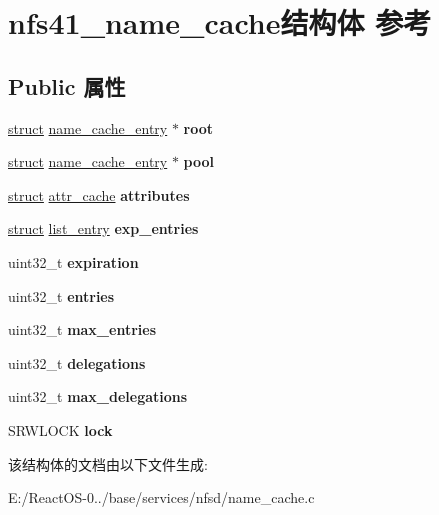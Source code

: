 \hypertarget{structnfs41__name__cache}{}\section{nfs41\+\_\+name\+\_\+cache结构体 参考}
\label{structnfs41__name__cache}
\subsection*{Public 属性}
\begin{DoxyCompactItemize}
\item 
\mbox{\label{structnfs41__name__cache_a488b35b5f3400b1c8a57eb3542071c91}} 
\hyperlink{interfacestruct}{struct} \hyperlink{structname__cache__entry}{name\+\_\+cache\+\_\+entry} $\ast$ {\bfseries root}
\item 
\mbox{\label{structnfs41__name__cache_a662be50ac4bb11db1a0e59beb7878007}} 
\hyperlink{interfacestruct}{struct} \hyperlink{structname__cache__entry}{name\+\_\+cache\+\_\+entry} $\ast$ {\bfseries pool}
\item 
\mbox{\label{structnfs41__name__cache_a0206087a30fb29598b186c6ed388f1f7}} 
\hyperlink{interfacestruct}{struct} \hyperlink{structattr__cache}{attr\+\_\+cache} {\bfseries attributes}
\item 
\mbox{\label{structnfs41__name__cache_a465667ff2b98b0042c92470016f69082}} 
\hyperlink{interfacestruct}{struct} \hyperlink{structlist__entry}{list\+\_\+entry} {\bfseries exp\+\_\+entries}
\item 
\mbox{\label{structnfs41__name__cache_a00b91dc94f7cc046602073ea33e02b7e}} 
uint32\+\_\+t {\bfseries expiration}
\item 
\mbox{\label{structnfs41__name__cache_ac04d28100f8d3a77b91ef792aec7998b}} 
uint32\+\_\+t {\bfseries entries}
\item 
\mbox{\label{structnfs41__name__cache_ad3fbc66a758fedbe0d779ea653c8ac3b}} 
uint32\+\_\+t {\bfseries max\+\_\+entries}
\item 
\mbox{\label{structnfs41__name__cache_a687ce9cc76311861710bb776f4d270cc}} 
uint32\+\_\+t {\bfseries delegations}
\item 
\mbox{\label{structnfs41__name__cache_ab997c83ce163ea9ad01e36b46cb9909a}} 
uint32\+\_\+t {\bfseries max\+\_\+delegations}
\item 
\mbox{\label{structnfs41__name__cache_ac198e4c245b972ffc5dac5e120934470}} 
S\+R\+W\+L\+O\+CK {\bfseries lock}
\end{DoxyCompactItemize}


该结构体的文档由以下文件生成\+:\begin{DoxyCompactItemize}
\item 
E\+:/\+React\+O\+S-\/0../base/services/nfsd/name\+\_\+cache.\+c\end{DoxyCompactItemize}

